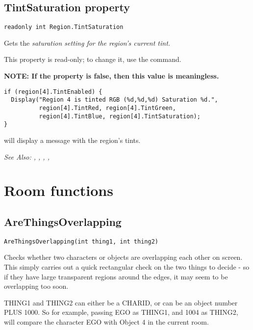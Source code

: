 \subsection{TintSaturation property}\label{Region.TintSaturation}%

\begin{verbatim}
readonly int Region.TintSaturation
\end{verbatim}
Gets the \it{saturation} setting for the region's current tint.

This property is read-only; to change it, use the  command.

\bf{NOTE:} If the  property is false, then
this value is meaningless.

\begin{verbatim}
if (region[4].TintEnabled) {
  Display("Region 4 is tinted RGB (%d,%d,%d) Saturation %d.",
          region[4].TintRed, region[4].TintGreen,
          region[4].TintBlue, region[4].TintSaturation);
}
\end{verbatim}
will display a message with the region's tints.

\it{See Also:} , ,
, 
, 



\section{Room functions}%


\subsection{AreThingsOverlapping}\label{AreThingsOverlapping}%

\begin{verbatim}
AreThingsOverlapping(int thing1, int thing2)
\end{verbatim}
Checks whether two characters or objects are overlapping each other on screen. This simply
carries out a quick rectangular check on the two things to decide - so if they have large
transparent regions around the edges, it may seem to be overlapping too soon.

THING1 and THING2 can either be a CHARID, or can be an object number PLUS 1000.
So for example, passing EGO as THING1, and 1004 as THING2, will compare the character EGO
with Object 4 in the current room.

